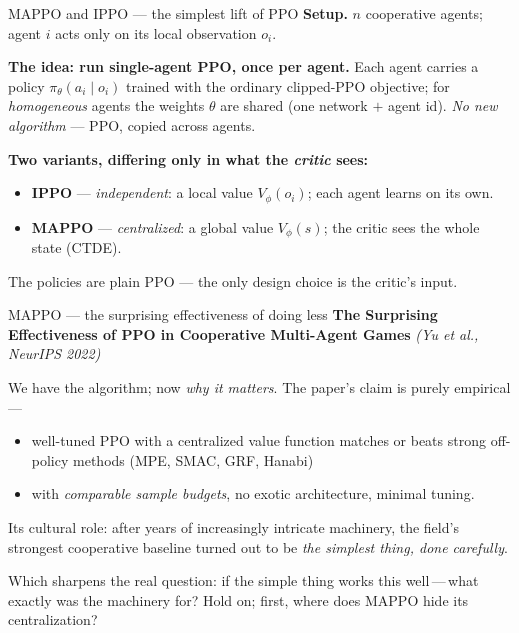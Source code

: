 \documentclass[10pt, aspectratio=169]{beamer}
\newcommand{\paper}[1]{\textcolor{mLightBrown}{\small\textit{(#1)}}}
\begin{document}
\begin{frame}{MAPPO and IPPO --- the simplest lift of PPO}
\textbf{Setup.} $n$ cooperative agents; agent $i$ acts only on its local observation $o_i$.
\medskip

\pause
\textbf{The idea: run single-agent PPO, once per agent.} Each agent carries a policy $\pi_\theta(a_i\mid o_i)$ trained with the ordinary clipped-PPO objective; for \emph{homogeneous} agents the weights $\theta$ are \alert{shared} (one network $+$ agent id). \emph{No new algorithm} --- PPO, copied across agents.
\medskip

\pause
\textbf{Two variants, differing only in what the \emph{critic} sees:}
\begin{itemize}\setlength\itemsep{3pt}
\item \textbf{IPPO} --- \emph{independent}: a local value $V_\phi(o_i)$; each agent learns on its own.
\item \textbf{MAPPO} --- \emph{centralized}: a global value $V_\phi(s)$; the critic sees the whole state (CTDE).
\end{itemize}
\medskip

\pause
\begin{center}
\alert{The policies are plain PPO --- the only design choice is the critic's input.}
\end{center}
\end{frame}

\begin{frame}{MAPPO --- the surprising effectiveness of doing less}
\textbf{The Surprising Effectiveness of PPO in Cooperative Multi-Agent Games} \paper{Yu et al., NeurIPS 2022}
\medskip

We have the algorithm; now \emph{why it matters}. The paper's claim is purely empirical ---
\begin{itemize}\setlength\itemsep{2pt}
\item well-tuned PPO with a centralized value function matches or beats strong off-policy methods (MPE, SMAC, GRF, Hanabi)

\item with \emph{comparable sample budgets}, no exotic architecture, minimal tuning.
\end{itemize}
\medskip

\pause
Its cultural role: after years of increasingly intricate machinery, the field's strongest cooperative baseline turned out to be \emph{the simplest thing, done carefully}.
\medskip

\pause
Which sharpens the real question: if the simple thing works this well\,---\,\alert{what exactly was the machinery for?} Hold on; first, where does MAPPO hide its centralization?
\end{frame}
\end{document}
